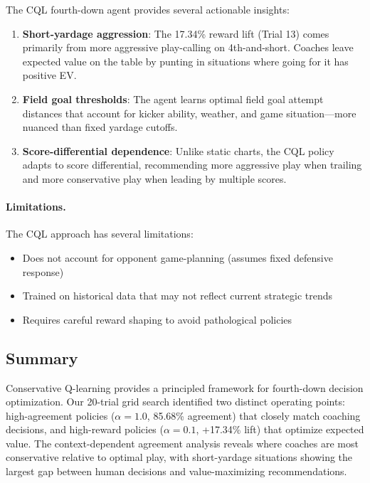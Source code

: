 The CQL fourth-down agent provides several actionable insights:

\begin{enumerate}
    \item \textbf{Short-yardage aggression}: The 17.34\% reward lift (Trial 13) comes primarily from more aggressive play-calling on 4th-and-short. Coaches leave expected value on the table by punting in situations where going for it has positive EV.

    \item \textbf{Field goal thresholds}: The agent learns optimal field goal attempt distances that account for kicker ability, weather, and game situation---more nuanced than fixed yardage cutoffs.

    \item \textbf{Score-differential dependence}: Unlike static charts, the CQL policy adapts to score differential, recommending more aggressive play when trailing and more conservative play when leading by multiple scores.
\end{enumerate}

\paragraph{Limitations.}
The CQL approach has several limitations:
\begin{itemize}
    \item Does not account for opponent game-planning (assumes fixed defensive response)
    \item Trained on historical data that may not reflect current strategic trends
    \item Requires careful reward shaping to avoid pathological policies
\end{itemize}

\subsection{Summary}

Conservative Q-learning provides a principled framework for fourth-down decision optimization. Our 20-trial grid search identified two distinct operating points: high-agreement policies ($\alpha=1.0$, 85.68\% agreement) that closely match coaching decisions, and high-reward policies ($\alpha=0.1$, +17.34\% lift) that optimize expected value. The context-dependent agreement analysis reveals where coaches are most conservative relative to optimal play, with short-yardage situations showing the largest gap between human decisions and value-maximizing recommendations.
